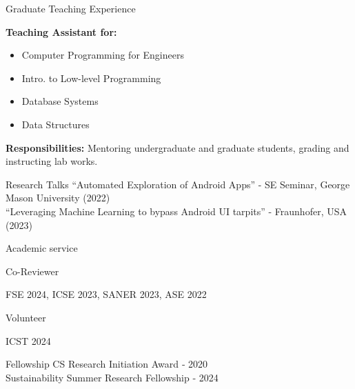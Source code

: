 \documentclass{resume} %
\begin{document}
\begin{rSection}{Graduate Teaching Experience}
\item{\bf Teaching Assistant for:}
\begin{itemize}
\item Computer Programming for Engineers
\item Intro. to Low-level Programming
\item Database Systems
\item Data Structures
\end{itemize}


\item{\bf Responsibilities:}
Mentoring undergraduate and graduate students, grading and instructing lab
works.
\end{rSection}
\newpage
\begin{rSection}{Research Talks}
``Automated Exploration of Android Apps'' - SE Seminar, George Mason University (2022)
\\
``Leveraging Machine Learning to bypass Android UI tarpits'' - Fraunhofer, USA (2023)
\end{rSection}


\begin{rSection}{Academic service}
\begin{rSubsection}{Co-Reviewer}{}{}{}
\item FSE 2024, ICSE 2023, SANER 2023, ASE 2022
\end{rSubsection}
\begin{rSubsection}{Volunteer}{}{}{}
\item ICST 2024
\end{rSubsection}
\end{rSection}

\begin{rSection}{Fellowship}
 CS Research Initiation Award ‑ 2020
 \\
 Sustainability Summer Research Fellowship ‑ 2024
\end{rSection}
\end{document}
